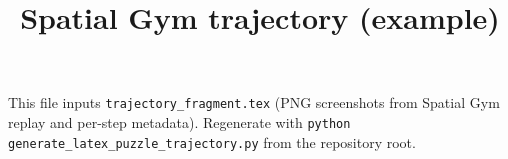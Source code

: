 \documentclass[11pt]{article}
\title{Spatial Gym trajectory (example)}
\author{}
\date{}
\begin{document}
\maketitle

\noindent
This file inputs \texttt{trajectory\_fragment.tex} (PNG screenshots from Spatial Gym replay
and per-step metadata). Regenerate with \texttt{python generate\_latex\_puzzle\_trajectory.py}
from the repository root.


\end{document}
